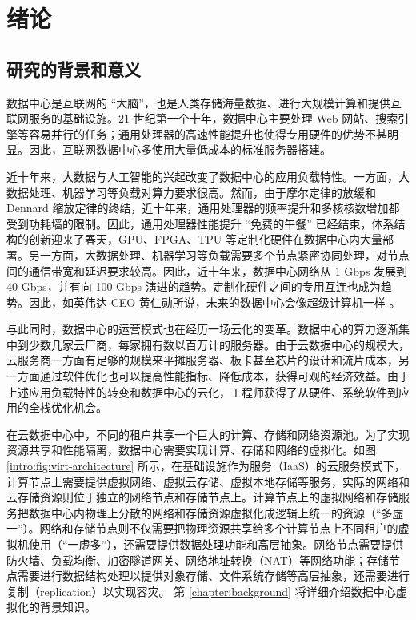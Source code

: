 \chapter{绪论}

\section{研究的背景和意义}


数据中心是互联网的 ``大脑''，也是人类存储海量数据、进行大规模计算和提供互联网服务的基础设施。21 世纪第一个十年，数据中心主要处理 Web 网站、搜索引擎等容易并行的任务；通用处理器的高速性能提升也使得专用硬件的优势不甚明显。因此，互联网数据中心多使用大量低成本的标准服务器搭建。

近十年来，大数据与人工智能的兴起改变了数据中心的应用负载特性。一方面，大数据处理、机器学习等负载对算力要求很高。然而，由于摩尔定律的放缓和 Dennard 缩放定律的终结，近十年来，通用处理器的频率提升和多核核数增加都受到功耗墙的限制。因此，通用处理器性能提升 ``免费的午餐'' 已经结束，体系结构的创新迎来了春天，GPU、FPGA、TPU 等定制化硬件在数据中心内大量部署。另一方面，大数据处理、机器学习等负载需要多个节点紧密协同处理，对节点间的通信带宽和延迟要求较高。因此，近十年来，数据中心网络从 1 Gbps 发展到 40 Gbps，并有向 100 Gbps 演进的趋势。定制化硬件之间的专用互连也成为趋势。因此，如英伟达 CEO 黄仁勋所说，未来的数据中心会像超级计算机一样 \cite{nvidia-datacenter}。

与此同时，数据中心的运营模式也在经历一场云化的变革。数据中心的算力逐渐集中到少数几家云厂商，每家拥有数以百万计的服务器。由于云数据中心的规模大，云服务商一方面有足够的规模来平摊服务器、板卡甚至芯片的设计和流片成本，另一方面通过软件优化也可以提高性能指标、降低成本，获得可观的经济效益。由于上述应用负载特性的转变和数据中心的云化，工程师获得了从硬件、系统软件到应用的全栈优化机会。

在云数据中心中，不同的租户共享一个巨大的计算、存储和网络资源池。为了实现资源共享和性能隔离，数据中心需要实现计算、存储和网络的虚拟化。如图 \ref{intro:fig:virt-architecture} 所示，在基础设施作为服务（IaaS）的云服务模式下，计算节点上需要提供虚拟网络、虚拟云存储、虚拟本地存储等服务，实际的网络和云存储资源则位于独立的网络节点和存储节点上。计算节点上的虚拟网络和存储服务把数据中心内物理上分散的网络和存储资源虚拟化成逻辑上统一的资源（``多虚一''）。网络和存储节点则不仅需要把物理资源共享给多个计算节点上不同租户的虚拟机使用（``一虚多''），还需要提供数据处理功能和高层抽象。网络节点需要提供防火墙、负载均衡、加密隧道网关、网络地址转换（NAT）等网络功能；存储节点需要进行数据结构处理以提供对象存储、文件系统存储等高层抽象，还需要进行复制（replication）以实现容灾。
第 \ref{chapter:background} 将详细介绍数据中心虚拟化的背景知识。



